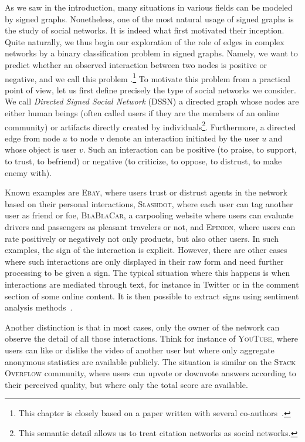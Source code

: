As we saw in the introduction, many situations in various fields can be modeled by signed graphs.
Nonetheless, one of the most natural usage of signed graphs is the study of social networks. It is
indeed what first motivated their inception. Quite naturally, we thus begin our exploration of the
role of edges in complex networks by a binary classification problem in signed graphs. Namely, we
want to predict whether an observed interaction between two nodes is positive or negative, and we
call this problem \esp{}.\footnote{This chapter is closely based on a paper written with several
co-authors~\autocite{trollSign17}.} To motivate this problem from a practical point of view, let us
first define precisely the type of social networks we consider. We call \emph{Directed Signed Social
Network} (DSSN) a directed graph whose nodes are either human beings (often called users if they are
the members of an online community) or artifacts directly created by individuals\footnote{This
semantic detail allows us to treat citation networks as social networks.}. Furthermore, a directed
edge from node $u$ to node $v$ denote an interaction initiated by the user $u$ and whose object is
user $v$. Such an interaction can be positive (to praise, to support, to trust, to befriend) or
negative (to criticize, to oppose, to distrust, to make enemy with).

Known examples are \textsc{Ebay}, where users trust or distrust agents in the network based on their
personal interactions, \textsc{Slashdot}, where each user can tag another user as friend or foe,
\textsc{BlaBlaCar}, a carpooling website where users can evaluate drivers and passengers as pleasant
travelers or not, and \textsc{Epinion}, where users can rate positively or negatively not only
products, but also other users. In such examples, the sign of the interaction is explicit. However,
there are other cases where such interactions are only displayed in their raw form and need further
processing to be given a sign. The typical situation where this happens is when interactions are
mediated through text, for instance in Twitter or in the comment section of some online content. It
is then possible to extract signs using sentiment analysis methods~\autocite{signedText12}.

Another distinction is that in most cases, only the owner of the network can observe the detail of
all those interactions.
Think for instance of \textsc{YouTube}, where users can like or dislike the video of another user
but where only aggregate anonymous statistics are available publicly. The situation is similar on
the \textsc{Stack Overflow} community, where users can upvote or downvote answers according to their
perceived quality, but where only the total score are available.

